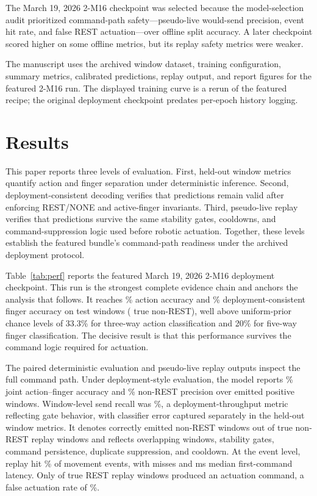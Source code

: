 \documentclass[conference]{IEEEtran}
\begin{document}
The March 19, 2026 2-M16 checkpoint was selected because the model-selection audit prioritized command-path safety---pseudo-live would-send precision, event hit rate, and false REST actuation---over offline split accuracy. A later checkpoint scored higher on some offline metrics, but its replay safety metrics were weaker.

The manuscript uses the archived window dataset, training configuration, summary metrics, calibrated predictions, replay output, and report figures for the featured 2-M16 run. The displayed training curve is a rerun of the featured recipe; the original deployment checkpoint predates per-epoch history logging.


\section{Results}
\label{sec:results}

This paper reports three levels of evaluation. First, held-out window metrics quantify action and finger separation under deterministic inference. Second, deployment-consistent decoding verifies that predictions remain valid after enforcing REST/NONE and active-finger invariants. Third, pseudo-live replay verifies that predictions survive the same stability gates, cooldowns, and command-suppression logic used before robotic actuation. Together, these levels establish the featured bundle's command-path readiness under the archived deployment protocol.

Table~\ref{tab:perf} reports the featured March 19, 2026 2-M16 deployment checkpoint. This run is the strongest complete evidence chain and anchors the analysis that follows. It reaches \FeaturedActionAcc\% action accuracy and \FeaturedFingerAcc\% deployment-consistent finger accuracy on \FeaturedNTest{} test windows (\FeaturedNNonRest{} true non-REST), well above uniform-prior chance levels of 33.3\% for three-way action classification and 20\% for five-way finger classification. The decisive result is that this performance survives the command logic required for actuation.

The paired deterministic evaluation and pseudo-live replay outputs inspect the full command path. Under deployment-style evaluation, the model reports \FeaturedJointAcc\% joint action--finger accuracy and \FeaturedReplayPrecision\% non-REST precision over \FeaturedReplayPositiveSendWindows{} emitted positive windows. Window-level send recall was \FeaturedReplayRecall\%, a deployment-throughput metric reflecting gate behavior, with classifier error captured separately in the held-out window metrics. It denotes \FeaturedReplayCorrectSendWindows{} correctly emitted non-REST windows out of \FeaturedReplayNonRestWindows{} true non-REST replay windows and reflects overlapping windows, stability gates, command persistence, duplicate suppression, and cooldown. At the event level, replay hit \FeaturedReplayEventHitRate\% of \FeaturedReplayEventCount{} movement events, with \FeaturedReplayEventMissCount{} misses and \FeaturedReplayLatencyMedianMs{} ms median first-command latency. Only \FeaturedReplayFalseActuationCount{} of \FeaturedReplayRestWindows{} true REST replay windows produced an actuation command, a false actuation rate of \FeaturedFalseActuationRateRest\%.
\end{document}
